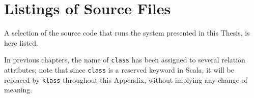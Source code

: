 \chapter{Listings of Source Files}
\label{ch:source}

A selection of the source code that runs the system presented in this Thesis, is here listed.

In previous chapters, the name of \texttt{class} has been assigned to several relation attributes; note that since \texttt{class} is a reserved keyword in Scala, it will be replaced by \texttt{klass} throughout this Appendix, without implying any change of meaning.





\lstset{style=mystyle}


